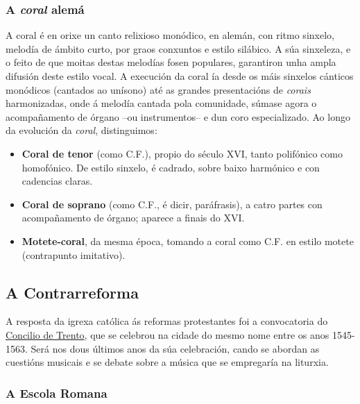 \subsubsection*{A \emph{coral} alemá}

\begin{multicols}{2}

A coral é en orixe un canto relixioso monódico, en alemán, con ritmo sinxelo, melodía de ámbito curto, por graos conxuntos e estilo silábico. A súa sinxeleza, e o feito de que moitas destas melodías fosen populares, garantiron unha ampla difusión deste estilo vocal. A execución da coral ía desde os máis sinxelos cánticos monódicos (cantados ao unísono) até as grandes presentacións de \emph{corais} harmonizadas, onde á melodía cantada pola comunidade, súmase agora o acompañamento de órgano --ou instrumentos-- e dun coro especializado.
Ao longo da evolución da \emph{coral}, distinguimos:

    \begin{itemize}
        \item 
        \textbf{Coral de tenor} (como C.F.), propio do século XVI, tanto polifónico como homofónico. De estilo sinxelo, é cadrado, sobre baixo harmónico e con cadencias claras.
        \item
        \textbf{Coral de soprano} (como C.F., é dicir, paráfrasis), a catro partes con acompañamento de órgano; aparece a finais do XVI.
        \item
        \textbf{Motete-coral}, da mesma época, tomando a coral como C.F. en estilo motete (contrapunto imitativo).
    \end{itemize}
\end{multicols}

\subsection*{A Contrarreforma}

A resposta da igrexa católica ás reformas protestantes foi a convocatoria do \href{http://es.wikipedia.org/wiki/Concilio_de_Trento}{Concilio de Trento}, que se celebrou na cidade do mesmo nome entre os anos 1545-1563. Será nos dous últimos anos da súa celebración, cando se abordan as cuestións musicais e se debate sobre a música que se empregaría na liturxia.

\subsubsection*{A Escola Romana}

